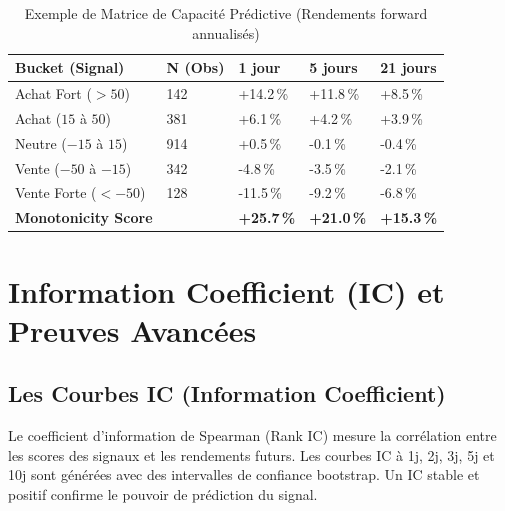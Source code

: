 \begin{table}[H]
\centering
\caption{Exemple de Matrice de Capacité Prédictive (Rendements forward annualisés)}
\label{tab:predictive_matrix}
\begin{tabularx}{\linewidth}{@{}lYYYY@{}}
\toprule
\textbf{Bucket (Signal)} & \textbf{N (Obs)} & \textbf{1 jour} & \textbf{5 jours} & \textbf{21 jours} \\
\midrule
Achat Fort ($> 50$)         & 142 & +14.2\,\% & +11.8\,\% & +8.5\,\% \\
Achat ($15$ à $50$)         & 381 &  +6.1\,\% &  +4.2\,\% & +3.9\,\% \\
Neutre ($-15$ à $15$)       & 914 &  +0.5\,\% &  -0.1\,\% & -0.4\,\% \\
Vente ($-50$ à $-15$)       & 342 &  -4.8\,\% &  -3.5\,\% & -2.1\,\% \\
Vente Forte ($< -50$)       & 128 & -11.5\,\% &  -9.2\,\% & -6.8\,\% \\
\midrule
\textbf{Monotonicity Score} & & \textbf{+25.7\,\%} & \textbf{+21.0\,\%} & \textbf{+15.3\,\%} \\
\bottomrule
\end{tabularx}
\end{table}

\section{Information Coefficient (IC) et Preuves Avancées}

\subsection{Les Courbes IC (Information Coefficient)}
Le coefficient d'information de Spearman (Rank IC) mesure la corrélation entre les
scores des signaux et les rendements futurs. Les courbes IC à 1j, 2j, 3j, 5j et 10j
sont générées avec des intervalles de confiance bootstrap. Un IC stable et positif
confirme le pouvoir de prédiction du signal.

